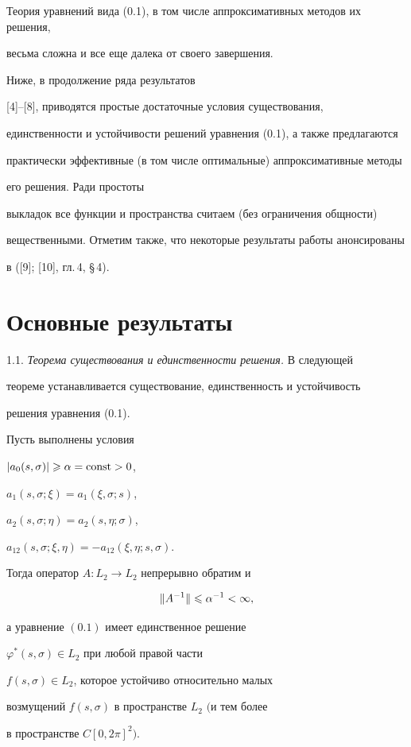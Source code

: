Теория уравнений вида (0.1), в том числе аппроксимативных методов их решения,


весьма сложна и все еще далека от своего завершения.


Ниже, в продолжение ряда результатов


[4]--[8], приводятся простые достаточные условия существования,


единственности и устойчивости решений уравнения (0.1), а также предлагаются


практически эффективные (в том числе оптимальные) аппроксимативные методы


его решения. Ради простоты


выкладок все функции и пространства считаем (без ограничения общности)


вещественными. Отметим также, что некоторые результаты работы анонсированы 


в ([9]; [10], гл.\,4, \S\,4).








\section{Основные результаты}





1.1. {\it Теорема существования и единственности решения.} В следующей 


теореме устанавливается существование, единственность  и устойчивость 


решения уравнения (0.1).





\begin{thm}


Пусть выполнены условия


$|a_0(s,\sigma )| \geqslant \alpha=\operatorname{const} > 0$,


$a_1(s,\sigma ;\xi )=a_1(\xi ,\sigma ;s)$, 


$a_2(s,\sigma ;\eta )=a_2(s,\eta ;\sigma)$,


$a_{12}(s,\sigma ;\xi ,\eta )=-a_{12}(\xi ,\eta ;s,\sigma )$. 





Тогда оператор $A: L_2\to L_2$ непрерывно обратим и 


$$


\|A^{-1}\|\lea \alpha^{-1}<\infty,


$$


а уравнение $(0.1)$ имеет единственное решение 


$\varphi^*(s,\sigma ){\in} L_2$ при любой правой части


$f(s,\sigma ){\in} L_2$, которое устойчиво относительно малых


возмущений $f(s,\sigma )$ в пространстве $L_2$ $($и тем более


в пространстве $C[0,2\pi]^2)$.


\end{thm}






